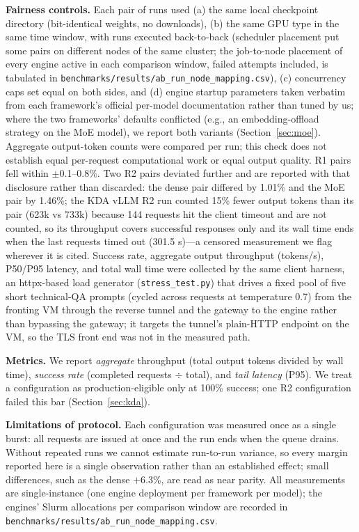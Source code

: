 \documentclass[11pt]{article}
\begin{document}
\textbf{Fairness controls.} Each pair of runs used (a) the same local checkpoint directory (bit-identical weights, no downloads), (b) the same GPU type in the same time window, with runs executed back-to-back (scheduler placement put some pairs on different nodes of the same cluster; the job-to-node placement of every engine active in each comparison window, failed attempts included, is tabulated in \texttt{benchmarks/results/ab\_run\_node\_mapping.csv}), (c) concurrency caps set equal on both sides, and (d) engine startup parameters taken verbatim from each framework's official per-model documentation rather than tuned by us; where the two frameworks' defaults conflicted (e.g., an embedding-offload strategy on the MoE model), we report both variants (Section~\ref{sec:moe}). Aggregate output-token counts were compared per run; this check does not establish equal per-request computational work or equal output quality. R1 pairs fell within $\pm$0.1--0.8\%. Two R2 pairs deviated further and are reported with that disclosure rather than discarded: the dense pair differed by 1.01\% and the MoE pair by 1.46\%; the KDA vLLM R2 run counted 15\% fewer output tokens than its pair (623k vs 733k) because 144 requests hit the client timeout and are not counted, so its throughput covers successful responses only and its wall time ends when the last requests timed out (301.5 s)---a censored measurement we flag wherever it is cited. Success rate, aggregate output throughput (tokens/s), P50/P95 latency, and total wall time were collected by the same client harness, an httpx-based load generator (\texttt{stress\_test.py}) that drives a fixed pool of five short technical-QA prompts (cycled across requests at temperature 0.7) from the fronting VM through the reverse tunnel and the gateway to the engine rather than bypassing the gateway; it targets the tunnel's plain-HTTP endpoint on the VM, so the TLS front end was not in the measured path.

\textbf{Metrics.} We report \emph{aggregate} throughput (total output tokens divided by wall time), \emph{success rate} (completed requests $\div$ total), and \emph{tail latency} (P95). We treat a configuration as production-eligible only at 100\% success; one R2 configuration failed this bar (Section~\ref{sec:kda}).

\textbf{Limitations of protocol.} Each configuration was measured once as a single burst: all requests are issued at once and the run ends when the queue drains. Without repeated runs we cannot estimate run-to-run variance, so every margin reported here is a single observation rather than an established effect; small differences, such as the dense $+$6.3\%, are read as near parity. All measurements are single-instance (one engine deployment per framework per model); the engines' Slurm allocations per comparison window are recorded in \texttt{benchmarks/\allowbreak results/\allowbreak ab\_run\_node\_mapping.csv}.
\end{document}
